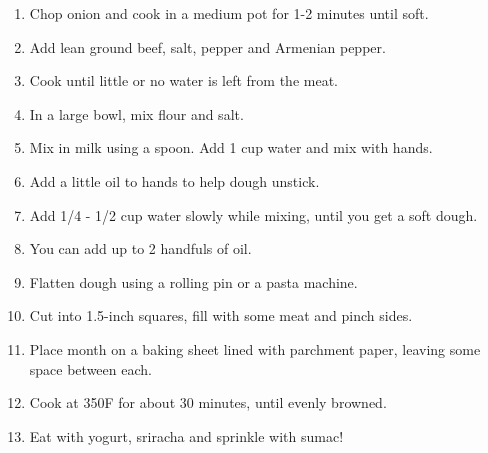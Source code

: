 \begin{enumerate}
    \item Chop onion and cook in a medium pot for 1-2 minutes until soft.
    \item Add lean ground beef, salt, pepper and Armenian pepper.
    \item Cook until little or no water is left from the meat.
    
    \item In a large bowl, mix flour and salt.
    \item Mix in milk using a spoon. Add 1 cup water and mix with hands.
    \item Add a little oil to hands to help dough unstick.
    \item Add 1/4 - 1/2 cup water slowly while mixing, until you get a soft dough.
    \item You can add up to 2 handfuls of oil.
    
    \item Flatten dough using a rolling pin or a pasta machine.
    \item Cut into 1.5-inch squares, fill with some meat and pinch sides.
    \item Place month on a baking sheet lined with parchment paper, leaving some space between each.
    \item Cook at 350\degree F for about 30 minutes, until evenly browned.
    \item Eat with yogurt, sriracha and sprinkle with sumac!
\end{enumerate}

